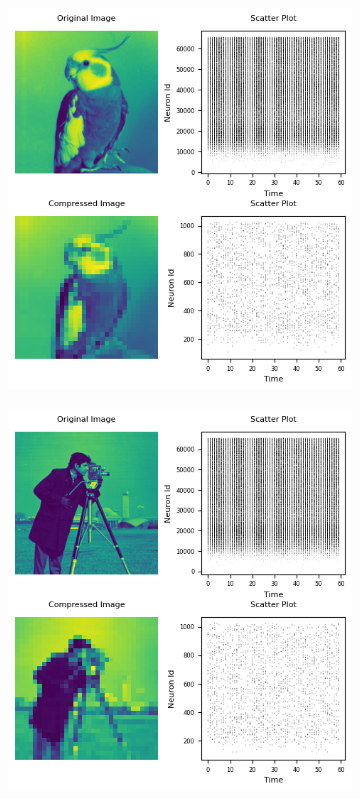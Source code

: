 \documentclass[12pt]{article}
\begin{document}
\begin{figure}[H]
\centering
  \begin{subfigure}[b]{0.45\textwidth}
    \includegraphics[width=\textwidth]{Figs/p_bird.png}
  \end{subfigure}
  \hfill
  \begin{subfigure}[b]{0.45\textwidth}
    \includegraphics[width=\textwidth]{Figs/p_cam.png}

\end{subfigure}
\end{figure}
\end{document}
